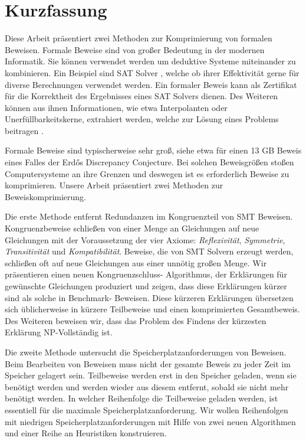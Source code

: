 \chapter*{Kurzfassung}

Diese Arbeit präsentiert zwei Methoden zur Komprimierung von formalen Beweisen.
Formale Beweise sind von gro{\ss}er Bedeutung in der modernen Informatik.
Sie k\"onnen verwendet werden um deduktive Systeme miteinander zu kombinieren. 
Ein Beispiel sind SAT Solver \cite{Biere2009}, welche ob ihrer Effektivit\"at gerne f\"ur diverse Berechnungen verwendet werden.
Ein formaler Beweis kann als Zertifikat f\"ur die Korrektheit des Ergebnisses eines SAT Solvers dienen.
Des Weiteren k\"onnen aus ihnen Informationen, wie etwa Interpolanten \cite{McMill2005} oder Unerf\"ullbarkeitskerne, extrahiert werden, welche zur L\"osung eines Problems beitragen \cite{Hofferek2013}.

Formale Beweise sind typischerweise sehr gro{\ss}, siehe etwa \cite{Konev2014} f\"ur einen 13 GB Beweis eines Falles der Erd\H{o}s Discrepancy Conjecture.
Bei solchen Beweisgr\"o{\ss}en sto{\ss}en Computersysteme an ihre Grenzen und deswegen ist es erforderlich Beweise zu komprimieren.
Unsere Arbeit pr\"asentiert zwei Methoden zur Beweiskomprimierung.

Die erste Methode entfernt Redundanzen im Kongruenzteil von SMT Beweisen.
Kongruenzbeweise schlie{\ss}en von einer Menge an Gleichungen auf neue Gleichungen mit der Voraussetzung der vier Axiome: \emph{Reflexivit\"at}, \emph{Symmetrie}, \emph{Transitivit\"at} und \emph{Kompatibilit\"at}.
Beweise, die von SMT Solvern erzeugt werden, schlie{\ss}en oft auf neue Gleichungen aus einer unn\"otig gro{\ss}en Menge.
Wir pr\"asentieren einen neuen Kongruenzschluss- Algorithmus, der Erkl\"arungen f\"ur gew\"unschte Gleichungen produziert und zeigen, dass diese Erkl\"arungen k\"urzer sind als solche in Benchmark- Beweisen.
Diese k\"urzeren Erkl\"arungen \"ubersetzen sich \"ublicherweise in k\"urzere Teilbeweise und einen komprimierten Gesamtbeweis.
Des Weiteren beweisen wir, dass das Problem des Findens der k\"urzesten Erkl\"arung NP-Vollst\"andig ist.

Die zweite Methode untersucht die Speicherplatzanforderungen von Beweisen.
Beim Bearbeiten von Beweisen muss nicht der gesamte Beweis zu jeder Zeit im Speicher gelagert sein.
Teilbeweise werden erst in den Speicher geladen, wenn sie ben\"otigt werden und werden wieder aus diesem entfernt, sobald sie nicht mehr ben\"otigt werden.
In welcher Reihenfolge die Teilbeweise geladen werden, ist essentiell f\"ur die maximale Speicherplatzanforderung.
Wir wollen Reihenfolgen mit niedrigen Speicherplatzanforderungen mit Hilfe von zwei neuen Algorithmen und einer Reihe an Heuristiken konstruieren.